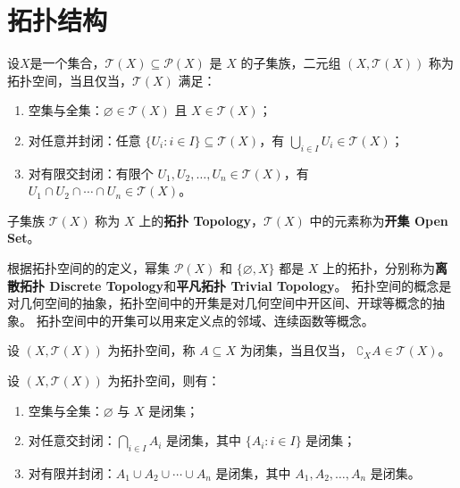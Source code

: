 \section{拓扑结构}

\begin{definition}
    设$ X $是一个集合，$ \mathcal{T}(X) \subseteq \mathcal{P}(X) $ 是 $ X $ 的子集族，二元组 $ (X,\mathcal{T}(X)) $ 称为拓扑空间，当且仅当，$ \mathcal{T}(X) $ 满足：
    \begin{enumerate}
        \item 空集与全集：$ \varnothing \in \mathcal{T}(X) $ 且 $ X \in \mathcal{T}(X) $；
        \item 对任意并封闭：任意 $ \{U_i:i\in I\} \subseteq \mathcal{T}(X) $，有 $ \bigcup_{i\in I} U_i \in \mathcal{T}(X) $；
        \item 对有限交封闭：有限个 $ U_1,U_2,\ldots,U_n\in \mathcal{T}(X) $，有 $ U_1\cap U_2\cap \cdots \cap U_n \in \mathcal{T}(X) $。
    \end{enumerate}
    子集族 $ \mathcal{T}(X) $ 称为 $ X $ 上的\textbf{拓扑 Topology}，$ \mathcal{T}(X) $ 中的元素称为\textbf{开集 Open Set}。
\end{definition}

\begin{note}
    根据拓扑空间的的定义，幂集 $ \mathcal{P}(X) $ 和 $ \{\varnothing,X\} $ 都是 $ X $ 上的拓扑，分别称为\textbf{离散拓扑 Discrete Topology}和\textbf{平凡拓扑 Trivial Topology}。
    拓扑空间的概念是对几何空间的抽象，拓扑空间中的开集是对几何空间中开区间、开球等概念的抽象。
    拓扑空间中的开集可以用来定义点的邻域、连续函数等概念。
\end{note}

\vspace{1em}

\begin{definition}
    设 $ (X,\mathcal{T}(X)) $ 为拓扑空间，称 $ A\subseteq X $ 为闭集，当且仅当， $ \complement_X A \in \mathcal{T}(X) $。
\end{definition}

\begin{proposition}[闭集的性质]
    设 $ (X,\mathcal{T}(X)) $ 为拓扑空间，则有：
    \begin{enumerate}
        \item 空集与全集：$ \varnothing $ 与 $ X $ 是闭集；
        \item 对任意交封闭：$ \bigcap_{i\in I} A_i $ 是闭集，其中 $ \{A_i:i\in I\}$ 是闭集；
        \item 对有限并封闭：$ A_1\cup A_2\cup \cdots \cup A_n $ 是闭集，其中 $ A_1,A_2,\ldots,A_n $ 是闭集。
    \end{enumerate}
\end{proposition}

